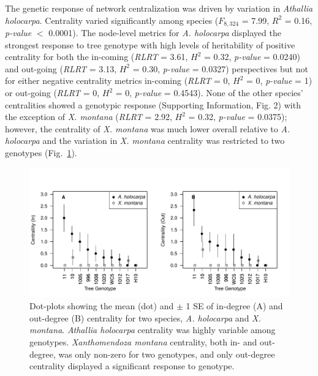 \documentclass[fleqn,12pt]{olplainarticle}
\begin{document}


The genetic response of network centralization was driven by variation
in \textit{Athallia holocarpa}. Centrality varied significantly among
species ($F_{8, 324}$ = 7.99, $R^2$ = 0.16, \textit{p-value} $<$
0.0001). The node-level metrics for \textit{A. holocarpa} displayed
the strongest response to tree genotype with high levels of
heritability of positive centrality for both the in-coming
(\textit{RLRT} = 3.61, $H^2$ = 0.32, \textit{p-value} = 0.0240) and
out-going (\textit{RLRT} = 3.13, $H^2$ = 0.30, \textit{p-value} =
0.0327) perspectives but not for either negative centrality metrics
in-coming (\textit{RLRT} = 0, $H^2$ = 0, \textit{p-value} = 1) or
out-going (\textit{RLRT} = 0, $H^2$ = 0, \textit{p-value} =
0.4543). None of the other species' centralities showed a genotypic
response (Supporting Information, Fig. 2) with the exception of
\textit{X. montana} (\textit{RLRT} = 2.92, $H^2$ = 0.32,
\textit{p-value} = 0.0375); however, the centrality of
\textit{X. montana} was much lower overall relative to
\textit{A. holocarpa} and the variation in \textit{X. montana}
centrality was restricted to two genotypes
(Fig.~\ref{fig:geno_sppcen}).



\begin{figure}[ht]
\centering
\includegraphics[width=\linewidth]{figures/geno_sppcen.pdf}
\caption{Dot-plots showing the mean (dot) and $\pm$ 1 SE of in-degree
  (A) and out-degree (B) centrality for two species,
  \textit{A. holocarpa} and \textit{X. montana}. \textit{Athallia
    holocarpa} centrality was highly variable among
  genotypes. \textit{Xanthomendoza montana} centrality, both in- and
  out-degree, was only non-zero for two genotypes, and only out-degree
  centrality displayed a significant response to genotype.}
\label{fig:geno_sppcen}
\end{figure}
\end{document}
